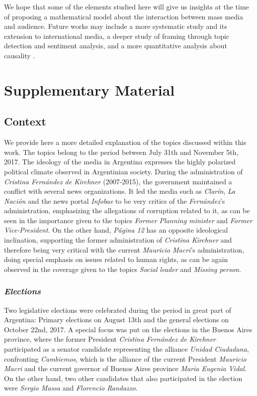 \documentclass{bmcart}
\begin{document}
\par We hope that some of the elements studied here will give us insights at the time of proposing a mathematical model about the interaction between mass media and audience. Future works may include a more systematic study and its extension to international media, a deeper study of framing through topic detection and sentiment analysis, and a more quantitative analysis about causality .

\newpage
\section*{Supplementary Material}
\subsection*{Context}
\label{sec:Context}

\par We provide here a more detailed explanation of the topics discussed within this work. The topics belong to the period between July 31th and November 5th, 2017.
The ideology of the media in Argentina expresses the highly polarized political climate observed in Argentinian society.
During the administration of \emph{Cristina Fern\'andez de Kirchner} (2007-2015), the government maintained a conflict with several news organizations.
It led the media such as \emph{Clar\'in}, \emph{La Naci\'on} and the news portal \emph{Infobae} to be very critics of the \emph{Fern\'andez}'s administration, emphasizing the allegations of corruption related to it, as can be seen in the importance given to the topics \emph{Former Planning minister} and \emph{Former Vice-President}.
On the other hand, \emph{P\'agina 12} has an opposite ideological inclination, supporting the former administration of \emph{Cristina Kirchner} and therefore being very critical with the current \emph{Mauricio Macri}'s administration, doing special emphasis on issues related to human rights, as can be again observed in the coverage given to the topics \emph{Social leader} and \emph{Missing person}.

\subsubsection*{\emph{Elections}}
\par Two legislative elections were celebrated during the period in great part of Argentina: Primary elections on August 13th and the general elections on October 22nd, 2017. 
A special focus was put on the elections in the Buenos Aires province, where the former President \emph{Cristina Fern\'andez de Kirchner} participated as a senator candidate representing the alliance \emph{Unidad Ciudadana}, confronting \emph{Cambiemos}, which is the alliance of the current President \emph{Mauricio Macri} and the current governor of Buenos Aires province \emph{Maria Eugenia Vidal}.
On the other hand, two other candidates that also participated in the election were \emph{Sergio Massa} and \emph{Florencio Randazzo}.
 
\end{document}
